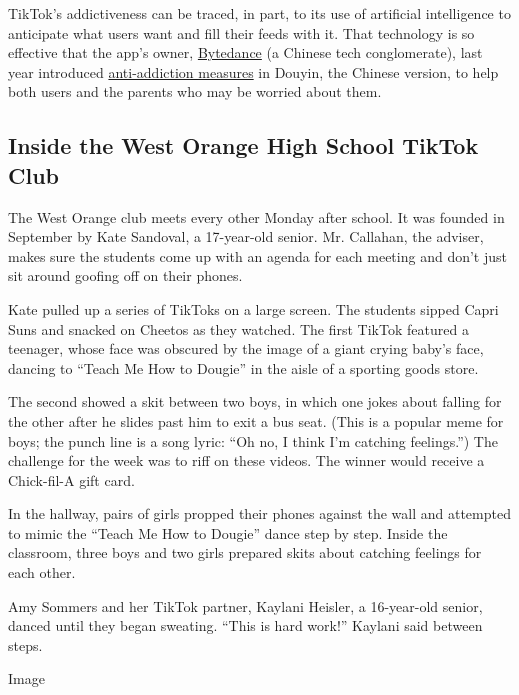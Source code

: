 TikTok's addictiveness can be traced, in part, to its use of artificial
intelligence to anticipate what users want and fill their feeds with it.
That technology is so effective that the app's owner,
\href{https://www.nytimes3xbfgragh.onion/2018/10/29/technology/bytedance-app-funding-china.html}{Bytedance}
(a Chinese tech conglomerate), last year introduced
\href{https://www.scmp.com/tech/apps-social/article/3003796/china-launches-anti-addiction-drive-protect-countrys-short-video}{anti-addiction
measures} in Douyin, the Chinese version, to help both users and the
parents who may be worried about them.

\hypertarget{inside-the-west-orange-high-school-tiktok-club}{%
\subsection{Inside the West Orange High School TikTok
Club}\label{inside-the-west-orange-high-school-tiktok-club}}

The West Orange club meets every other Monday after school. It was
founded in September by Kate Sandoval, a 17-year-old senior. Mr.
Callahan, the adviser, makes sure the students come up with an agenda
for each meeting and don't just sit around goofing off on their phones.

Kate pulled up a series of TikToks on a large screen. The students
sipped Capri Suns and snacked on Cheetos as they watched. The first
TikTok featured a teenager, whose face was obscured by the image of a
giant crying baby's face, dancing to ``Teach Me How to Dougie'' in the
aisle of a sporting goods store.

The second showed a skit between two boys, in which one jokes about
falling for the other after he slides past him to exit a bus seat. (This
is a popular meme for boys; the punch line is a song lyric: ``Oh no, I
think I'm catching feelings.'') The challenge for the week was to riff
on these videos. The winner would receive a Chick-fil-A gift card.

In the hallway, pairs of girls propped their phones against the wall and
attempted to mimic the ``Teach Me How to Dougie'' dance step by step.
Inside the classroom, three boys and two girls prepared skits about
catching feelings for each other.

Amy Sommers and her TikTok partner, Kaylani Heisler, a 16-year-old
senior, danced until they began sweating. ``This is hard work!'' Kaylani
said between steps.

Image

